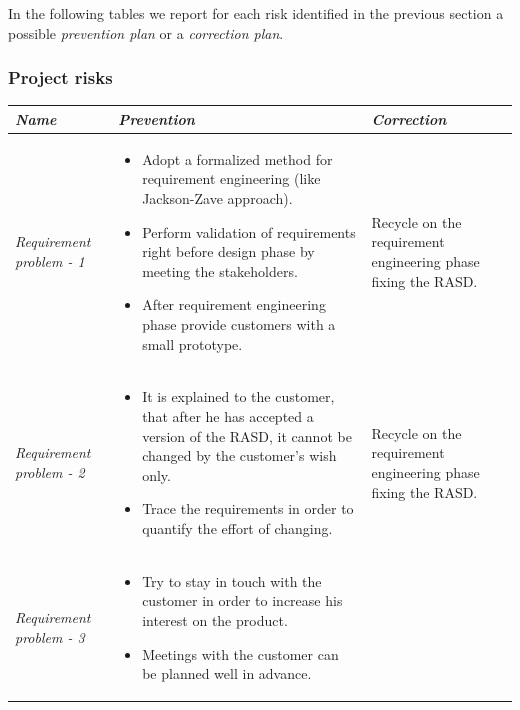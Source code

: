 In the following tables we report for each risk identified in the
previous section a possible \emph{prevention plan} or a \emph{correction
plan}.

\begin{landscape}


\subsubsection{Project risks}

\medskip{}


\begin{tabular}{>{\raggedright}p{4cm}|>{\raggedright}p{10cm}|>{\raggedright}p{8cm}}
\hline 
\emph{Name} & \emph{Prevention} & \emph{Correction}\tabularnewline
\hline 
\hline 
\emph{Requirement problem - 1} & \begin{itemize}
\item {\small{}Adopt a formalized method for requirement engineering (like
Jackson-Zave approach).}{\small \par}
\item {\small{}Perform validation of requirements right before design phase
by meeting the stakeholders.}{\small \par}
\item {\small{}After requirement engineering phase provide customers with
a small prototype.}\end{itemize}
 & {\small{}Recycle on the requirement engineering phase fixing the RASD.}\tabularnewline
\hline 
\emph{Requirement problem - 2} & \begin{itemize}
\item {\small{}It is explained to the customer, that after he has accepted
a version of the RASD, it cannot be changed by the customer’s wish
only.}{\small \par}
\item {\small{}Trace the requirements in order to quantify the effort of
changing.}\end{itemize}
 & {\small{}Recycle on the requirement engineering phase fixing the RASD.}\tabularnewline
\hline 
\emph{Requirement problem - 3} & \begin{itemize}
\item {\small{}Try to stay in touch with the customer in order to increase
his interest on the product.}{\small \par}
\item {\small{}Meetings with the customer can be planned well in advance.}\end{itemize}

\end{tabular}
\end{landscape}
